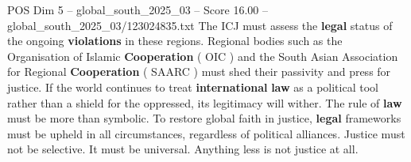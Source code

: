 \begin{textsample}{POS Dim 5 – global\_south\_2025\_03 – Score 16.00 – global\_south\_2025\_03/123024835.txt}
The ICJ must assess the \textbf{legal} status of the ongoing \textbf{violations} in these regions.
Regional bodies such as the Organisation of Islamic \textbf{Cooperation} ( OIC ) and the South Asian Association for Regional \textbf{Cooperation} ( SAARC ) must shed their passivity and press for justice.
If the world continues to treat \textbf{international} \textbf{law} as a political tool rather than a shield for the oppressed, its legitimacy will wither.
The rule of \textbf{law} must be more than symbolic.
To restore global faith in justice, \textbf{legal} frameworks must be upheld in all circumstances, regardless of political alliances.
Justice must not be selective.
It must be universal.
Anything less is not justice at all.

\end{textsample}
